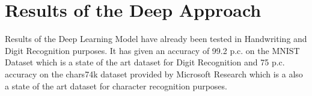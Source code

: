 \section{Results of the Deep Approach}
\label{sec:results2}

Results of the Deep Learning Model have already been tested in Handwriting  and Digit Recognition purposes. It has given an accuracy of 99.2 p.c. on the MNIST Dataset which is a state of the art dataset for Digit Recognition and 75 p.c. accuracy on the chars74k dataset provided by Microsoft Research which is a also a state of the art dataset for character recognition purposes. 